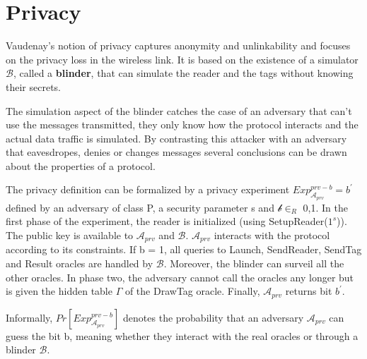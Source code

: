 
    \section{Privacy}
    \hspace*{0.4cm} 

    Vaudenay's notion of privacy captures anonymity and unlinkability and focuses on the privacy loss in the wireless link. It is based on 
    the existence of a simulator $\mathcal{B}$, called a \textbf{blinder}, that can simulate the reader and the tags without knowing their secrets.
    
    The simulation aspect of the blinder catches the case of an adversary that can't use the messages transmitted, they only know how the protocol
    interacts and the actual data traffic is simulated. By contrasting this attacker with an adversary that eavesdropes, denies or changes messages
    several conclusions can be drawn about the properties of a protocol.

    \vspace{0.3cm}

    The privacy definition can be formalized by a privacy experiment $Exp_{\mathcal{A}_{prv}}^{prv-b} = b^{'}$ defined by an adversary of class P, a
    security parameter s and $\mathcal{b} \in_{R}$ {0,1}. In the first phase of the experiment, the reader is initialized (using SetupReader($1^s$)). 
    The public key is available to $\mathcal{A}_{prv}$ and $\mathcal{B}$. $\mathcal{A}_{prv}$ interacts with the protocol according to its constraints.
    If b = 1, all queries to Launch, SendReader, SendTag and Result oracles are handled by $\mathcal{B}$. Moreover, the blinder can surveil all the other
    oracles. In phase two, the adversary cannot call the oracles any longer but is given the hidden table $\Gamma$ of the DrawTag oracle. Finally, 
    $\mathcal{A}_{prv}$ returns bit $b^{'}$.

    Informally, $Pr[Exp_{\mathcal{A}_{prv}}^{prv-b}]$ denotes the probability that an adversary $\mathcal{A}_{prv}$
    can guess the bit b, meaning whether they interact with the real oracles or through a blinder $\mathcal{B}$.

